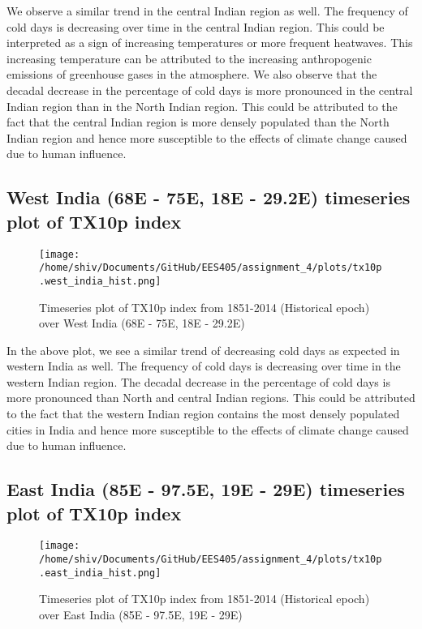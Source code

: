\documentclass[a4paper, 12pt, twoside]{report}
\begin{document}
We observe a similar trend in the central Indian region as well. The frequency of cold days is decreasing over time in the central Indian region. This could be interpreted as a sign of increasing temperatures or more frequent heatwaves. This increasing temperature can be attributed to the increasing anthropogenic emissions of greenhouse gases in the atmosphere. We also observe that the decadal decrease in the percentage of cold days is more pronounced in the central Indian region than in the North Indian region. This could be attributed to the fact that the central Indian region is more densely populated than the North Indian region and hence more susceptible to the effects of climate change caused due to human influence.
\newpage
\subsection{West India (68E - 75E, 18E - 29.2E) timeseries plot of TX10p index}

\begin{figure}[h]
    \centering
    \texttt{[image: /home/shiv/Documents/GitHub/EES405/assignment\_4/plots/tx10p.west\_india\_hist.png]}
    \caption{\centering Timeseries plot of TX10p index from 1851-2014 (Historical epoch) over West India (68E - 75E, 18E - 29.2E)}
    \label{fig:TX10p_timeseries_west_india}
\end{figure}

In the above plot, we see a similar trend of decreasing cold days as expected in western India as well. The frequency of cold days is decreasing over time in the western Indian region. The decadal decrease in the percentage of cold days is more pronounced than North and central Indian regions. This could be attributed to the fact that the western Indian region contains the most densely populated cities in India and hence more susceptible to the effects of climate change caused due to human influence.
\newpage
\subsection{East India (85E - 97.5E, 19E - 29E) timeseries plot of TX10p index}

\begin{figure}[h]
    \centering
    \texttt{[image: /home/shiv/Documents/GitHub/EES405/assignment\_4/plots/tx10p.east\_india\_hist.png]}
    \caption{\centering Timeseries plot of TX10p index from 1851-2014 (Historical epoch) over East India (85E - 97.5E, 19E - 29E)}
    \label{fig:TX10p_timeseries_east_india}
\end{figure}
\end{document}

